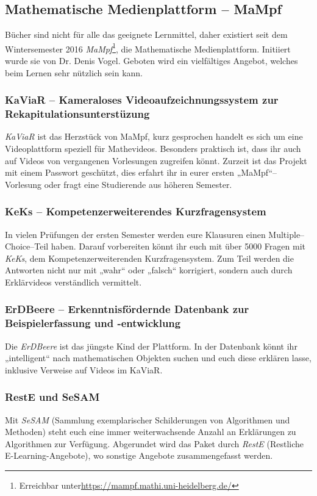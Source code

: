 \subsection{Mathematische Medienplattform -- MaMpf}
\label{mampf}

Bücher sind nicht für alle das geeignete Lernmittel, daher existiert seit dem Wintersemester 2016 \emph{MaMpf}\footnote{Erreichbar unter\url{https://mampf.mathi.uni-heidelberg.de/}}, die Mathematische Medienplattform. Initiiert wurde sie von Dr. Denis Vogel. Geboten wird ein vielfältiges Angebot, welches beim Lernen sehr nützlich sein kann.

\subsubsection{KaViaR -- Kameraloses Videoaufzeichnungssystem zur Rekapitulationsunterstüzung}
\emph{KaViaR} ist das Herzstück von MaMpf, kurz gesprochen handelt es sich um eine Videoplattform speziell für Mathevideos. Besonders praktisch ist, dass ihr auch auf Videos von vergangenen Vorlesungen zugreifen könnt. Zurzeit ist das Projekt mit einem Passwort geschützt, dies erfahrt ihr in eurer ersten „MaMpf“--Vorlesung oder fragt eine Studierende aus höheren Semester.

\subsubsection{KeKs -- Kompetenzerweiterendes Kurzfragensystem}
In vielen Prüfungen der ersten Semester werden eure Klausuren einen Multiple--Choice--Teil haben. Darauf vorbereiten könnt ihr euch mit über 5000 Fragen mit \emph{KeKs}, dem Kompetenzerweiterenden Kurzfragensystem. Zum Teil werden die Antworten nicht nur mit „wahr“ oder „falsch“ korrigiert, sondern auch durch Erklärvideos verständlich vermittelt.

\subsubsection{ErDBeere -- Erkenntnisfördernde Datenbank zur Beispielerfassung und -entwicklung}
Die \emph{ErDBeere} ist das jüngste Kind der Plattform. In der Datenbank könnt ihr „intelligent“ nach mathematischen Objekten suchen und euch diese erklären lasse, inklusive Verweise auf Videos im KaViaR.

\subsubsection{RestE und SeSAM}
Mit \emph{SeSAM} (Sammlung exemplarischer Schilderungen von Algorithmen und Methoden) steht euch eine immer weiterwachsende Anzahl an Erklärungen zu Algorithmen zur Verfügung. Abgerundet wird das Paket durch \emph{RestE} (Restliche E-Learning-Angebote), wo sonstige Angebote zusammengefasst werden.
